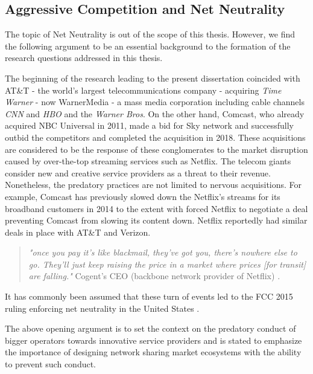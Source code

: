 \subsection{Aggressive Competition and Net Neutrality}
\label{Back:Sec:sharing:sub:competition}
The topic of Net Neutrality is out of the scope of this thesis. However, we find the following argument to be an essential background to the formation of the research questions addressed in this thesis.

The beginning of the research leading to the present dissertation coincided with AT\&T - the world's largest telecommunications company - acquiring \textit{Time Warner} - now WarnerMedia - a mass media corporation including cable channels \textit{CNN} and \textit{HBO} and the \textit{Warner Bros}. On the other hand, Comcast, who already acquired NBC Universal in 2011, made a bid for Sky network and successfully outbid the competitors and completed the acquisition in 2018. These acquisitions are considered to be the response of these conglomerates to the market disruption caused by over-the-top streaming services such as Netflix. The telecom giants consider new and creative service providers as a threat to their revenue. Nonetheless, the predatory practices are not limited to nervous acquisitions. For example, Comcast has previously slowed down the Netflix's streams for its broadband customers in 2014 to the extent with forced Netflix to negotiate a deal preventing Comcast from slowing its content down. Netflix reportedly had similar deals in place with AT\&T and Verizon. 
\vspace{-5pt}
\begin{quote}
  \textit{"once you pay it's like blackmail, they've got you, there's nowhere else to go. They'll just keep raising the price in a market where prices [for transit] are falling."}
  Cogent's CEO (backbone network provider of Netflix) \cite{lee_comcasts_2014}.
\end{quote}
\vspace{-5pt}

It has commonly been assumed that these turn of events led to the \ac{FCC} 2015 ruling enforcing net neutrality in the United States \cite{lindeberg2019coordinating}. 

The above opening argument is to set the context on the predatory conduct of bigger operators towards innovative service providers and is stated to emphasize the importance of designing network sharing market ecosystems with the ability to prevent such conduct.



